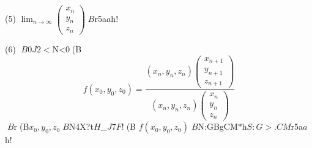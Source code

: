 \documentclass[a4j]{jarticle}
\let \ds \displaystyle
\begin{document}
\begin{screen}
 (5) $\ds \lim_{n\rightarrow\infty}\begin{pmatrix} x_n \\ y_n \\ z_n \end{pmatrix}$$B$r5a$a$h!%
\end{screen}

\begin{screen}
 (6) $B0J2<$N<0(B
 $$f(x_0,y_0,z_0)=\frac{(x_n,y_n,z_n)\begin{pmatrix} x_{n+1} \\ y_{n+1} \\ z_{n+1} \end{pmatrix}}{(x_n,y_n,z_n)\begin{pmatrix} x_n \\ y_n \\ z_n \end{pmatrix}}$$
 $B$r(B$x_0,y_0,z_0$$B$N4X?t$H$_$J$7$F!$(B $f(x_0,y_0,z_0)$$B$N:GBgCM$*$h$S:G>.CM$r5a$a$h!%
\end{screen}
\end{document}
